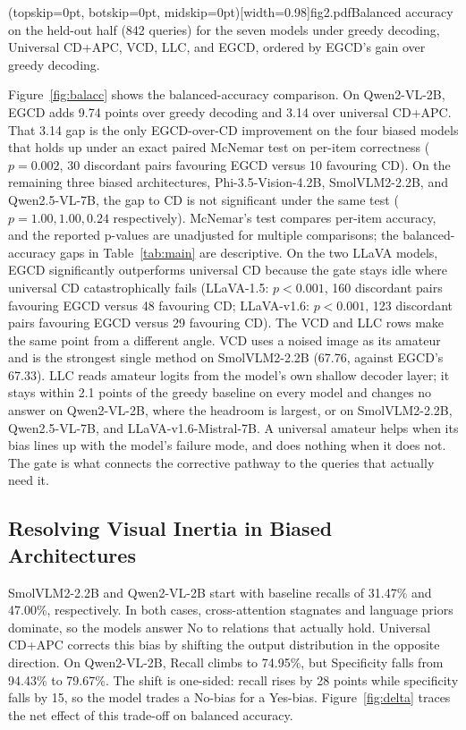 \documentclass{ieeeaccess}
\begin{document}
\Figure[!ht](topskip=0pt, botskip=0pt, midskip=0pt)[width=0.98\columnwidth]{fig2.pdf}{Balanced accuracy on the held-out half (842 queries) for the seven models under greedy decoding, Universal CD+APC, VCD, LLC, and EGCD, ordered by EGCD's gain over greedy decoding.\label{fig:balacc}}

Figure~\ref{fig:balacc} shows the balanced-accuracy comparison. On Qwen2-VL-2B, EGCD adds 9.74 points over greedy decoding and 3.14 over universal CD+APC. That 3.14 gap is the only EGCD-over-CD improvement on the four biased models that holds up under an exact paired McNemar test \cite{dietterich1998approximate} on per-item correctness ($p = 0.002$, 30 discordant pairs favouring EGCD versus 10 favouring CD). On the remaining three biased architectures, Phi-3.5-Vision-4.2B, SmolVLM2-2.2B, and Qwen2.5-VL-7B, the gap to CD is not significant under the same test ($p = 1.00, 1.00, 0.24$ respectively). McNemar's test compares per-item accuracy, and the reported p-values are unadjusted for multiple comparisons; the balanced-accuracy gaps in Table~\ref{tab:main} are descriptive. On the two LLaVA models, EGCD significantly outperforms universal CD because the gate stays idle where universal CD catastrophically fails (LLaVA-1.5: $p < 0.001$, 160 discordant pairs favouring EGCD versus 48 favouring CD; LLaVA-v1.6: $p < 0.001$, 123 discordant pairs favouring EGCD versus 29 favouring CD). The VCD and LLC rows make the same point from a different angle. VCD uses a noised image as its amateur and is the strongest single method on SmolVLM2-2.2B (67.76, against EGCD's 67.33). LLC reads amateur logits from the model's own shallow decoder layer; it stays within 2.1 points of the greedy baseline on every model and changes no answer on Qwen2-VL-2B, where the headroom is largest, or on SmolVLM2-2.2B, Qwen2.5-VL-7B, and LLaVA-v1.6-Mistral-7B. A universal amateur helps when its bias lines up with the model's failure mode, and does nothing when it does not. The gate is what connects the corrective pathway to the queries that actually need it.

\subsection{Resolving Visual Inertia in Biased Architectures}\label{subsec:resolve}

SmolVLM2-2.2B and Qwen2-VL-2B start with baseline recalls of 31.47\% and 47.00\%, respectively. In both cases, cross-attention stagnates and language priors dominate, so the models answer No to relations that actually hold. Universal CD+APC corrects this bias by shifting the output distribution in the opposite direction. On Qwen2-VL-2B, Recall climbs to 74.95\%, but Specificity falls from 94.43\% to 79.67\%. The shift is one-sided: recall rises by 28 points while specificity falls by 15, so the model trades a No-bias for a Yes-bias. Figure~\ref{fig:delta} traces the net effect of this trade-off on balanced accuracy.
\end{document}
